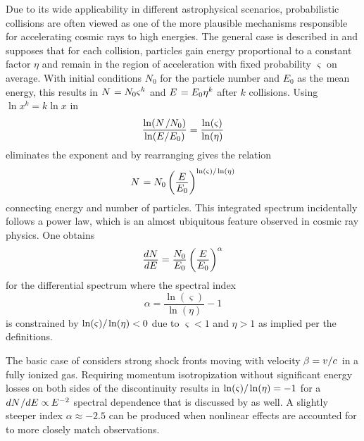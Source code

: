Due to its wide applicability in different astrophysical scenarios, probabilistic collisions are often viewed as one of
the more plausible mechanisms responsible for accelerating cosmic rays to high energies. The general case is described in
\cite{Longair_2011} and supposes that for each collision, particles gain energy proportional to a constant factor $\eta$ and
remain in the region of acceleration with fixed probability $\varsigma$ on average. With initial conditions $N_0$ for the
particle number and $E_0$ as the mean energy, this results in $N \kern+0.9pt = N_0 \varsigma^k$ and $E \kern+0.9pt = E_0 \eta^k$
after $k$ collisions. Using $\ln x^k = k\ln x$ in
\begin{equation*}
	\frac{\ln (N \kern+1.0pt / N_0)}{\ln (E / E_0)} = \frac{\ln(\varsigma)}{\ln(\eta)}
\end{equation*}
eliminates the exponent and by rearranging gives the relation
\begin{equation*}
	N \kern+0.9pt = N_0 \left( \frac{\raisebox{-0.3ex}{$E$}}{\raisebox{0.3ex}{$E_0$}} \right)^{\ln(\varsigma) / \kern-0.5pt \ln(\eta)}
\end{equation*}
connecting energy and number of particles. This integrated spectrum incidentally follows a power law, which is an almost
ubiquitous feature observed in cosmic ray physics. One obtains
\begin{equation*}
	\frac{\raisebox{-0.3ex}{$dN$}}{\raisebox{0.3ex}{$dE$}} = \frac{\raisebox{-0.3ex}{$N_0$}}{\raisebox{0.3ex}{$E_0$}}
	\left( \frac{\raisebox{-0.3ex}{$E$}}{\raisebox{0.3ex}{$E_0$}} \right)^\alpha
\end{equation*}
for the differential spectrum where the spectral index
\begin{equation*}
	\alpha = \frac{\ln(\varsigma)}{\ln(\eta)} - 1
\end{equation*}
is constrained by $\ln(\varsigma) / \kern-0.5pt \ln(\eta) < 0$ due to $\varsigma < 1$ and $\eta > 1$ as implied per the definitions.

The basic case of  considers strong shock fronts moving with velocity $\kern-0.5pt \beta = v / c \kern+1.0pt$ in a
fully ionized gas. Requiring momentum isotropization without significant energy losses on both sides of the discontinuity results
in $\ln(\varsigma) / \kern-0.5pt \ln(\eta) = -1$ for a $dN \kern+0.5pt / dE \propto \kern-0.5pt E^{-2}$ spectral dependence that
is discussed by \cite{Longair_2011} as well. A slightly steeper index $\alpha \approx \num{-2.5}$ can be produced when nonlinear
effects are accounted for to more closely match observations.

